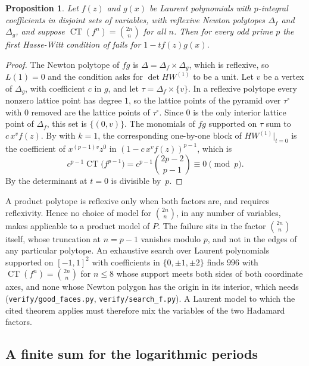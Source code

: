 \documentclass[11pt]{amsart}
\newtheorem{proposition}[theorem]{Proposition}
\theoremstyle{definition}
\theoremstyle{remark}
\begin{document}
\begin{proposition}\label{prop:product-obstruction}
Let $f(z)$ and $g(x)$ be Laurent polynomials with $p$-integral
coefficients in disjoint sets of variables, with reflexive Newton
polytopes $\Delta_f$ and $\Delta_g$, and suppose
$\operatorname{CT}(f^n)=\binom{2n}{n}$ for all $n$.  Then for every odd
prime $p$ the first Hasse-Witt condition of \cite[Definition~3.2]{BV}
fails for $1-tf(z)g(x)$.
\end{proposition}

\begin{proof}
The Newton polytope of $fg$ is $\Delta=\Delta_f\times\Delta_g$, which is
reflexive, so $L(1)=0$ and the condition asks for $\det HW^{(1)}$ to be a
unit.  Let $v$ be a vertex of $\Delta_g$, with coefficient $c$ in $g$, and
let $\tau=\Delta_f\times\{v\}$.  In a reflexive polytope every nonzero
lattice point has degree $1$, so the lattice points of the pyramid over
$\tau^\circ$ with $0$ removed are the lattice points of $\tau^\circ$.
Since $0$ is the only interior lattice point of $\Delta_f$, this set is
$\{(0,v)\}$.  The monomials of $fg$ supported on $\tau$ sum to
$c\,x^v f(z)$.  By \cite[Lemma~3.6]{BV} with $k=1$, the corresponding
one-by-one block of $HW^{(1)}|_{t=0}$ is the coefficient of
$x^{(p-1)v}z^0$ in $(1-c\,x^vf(z))^{p-1}$, which is
\[
 c^{p-1}\operatorname{CT}\bigl(f^{p-1}\bigr)
 =c^{p-1}\binom{2p-2}{p-1}\equiv0\pmod p.
\]
By \cite[Proposition~3.5]{BV} the determinant at $t=0$ is divisible
by~$p$.
\end{proof}

A product polytope is reflexive only when both factors are, and
\cite[Proposition~1.8]{BV} requires reflexivity.  Hence no choice of
model for $\binom{2n}{n}$, in any number of variables, makes \cite[Proposition~1.8]{BV} applicable to a product model of $P$.
The failure sits in the factor $\binom{2n}{n}$ itself, whose truncation
at $n=p-1$ vanishes modulo $p$, and not in the edges of any particular
polytope.  An exhaustive search over Laurent polynomials supported on
$[-1,1]^2$ with coefficients in $\{0,\pm1,\pm2\}$ finds $996$ with $\operatorname{CT}(f^n)=\binom{2n}{n}$ for
$n\le8$ whose support meets both sides of both coordinate axes, and none whose Newton polygon has the origin
in its interior, which \cite[Proposition~1.8]{BV} needs (\texttt{verify/good\_faces.py}, \texttt{verify/search\_f.py}).  A Laurent model to which the cited
theorem applies must therefore mix the variables of the two Hadamard
factors.

\subsection{A finite sum for the logarithmic periods}
\end{document}
